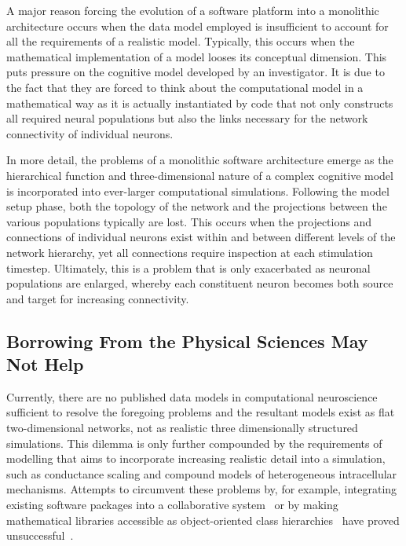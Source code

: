 \documentclass[11pt,3p,twocolumn]{JMN}
\begin{document}
A major reason forcing the evolution of a software platform into a monolithic architecture occurs when the data model employed is insufficient to account for all the requirements of a realistic model. Typically, this occurs when the mathematical implementation of a model looses its conceptual dimension. This puts pressure on the cognitive model developed by an investigator. It is due to the fact that they are forced to think about the computational model in a mathematical way as it is actually instantiated by code that not only constructs all required neural populations but also the links necessary for the network connectivity of individual neurons.

In more detail, the problems of a monolithic software architecture emerge as the hierarchical function and three-dimensional nature of a complex cognitive model is incorporated into ever-larger computational simulations. Following the model setup phase, both the topology of the network and the projections between the various populations typically are lost. This occurs when the projections and connections of individual neurons exist within and between different levels of the network hierarchy, yet all connections require inspection at each stimulation timestep. Ultimately, this is a problem that is only exacerbated as neuronal populations are enlarged, whereby each constituent neuron becomes both source and target for increasing connectivity.

\subsection{Borrowing From the Physical Sciences May Not Help}

Currently, there are no published data models in computational neuroscience sufficient to resolve the foregoing problems and the resultant models exist as flat two-dimensional networks, not as realistic three dimensionally structured simulations. This dilemma is only further compounded by the requirements of modelling that aims to incorporate increasing realistic detail into a simulation, such as conductance scaling and compound models of heterogeneous intracellular mechanisms. Attempts to circumvent these problems by, for example, integrating existing software packages into a collaborative system~\citep{goddard01:_neosim} or by making mathematical libraries accessible as object-oriented class hierarchies~\citep{vibert01} have proved unsuccessful~\citep{cornelis03}.
\end{document}
